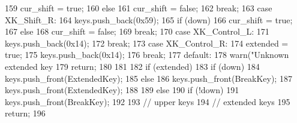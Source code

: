 \begin{DoxyCode}
{{{{159                     cur_shift = true;
160                 else
161                     cur_shift = false;
162                 break;
163              case XK_Shift_R:
164                 keys.push_back(0x59);
165                 if (down)
166                     cur_shift = true;
167                 else
168                     cur_shift = false;
169                 break;
170              case XK_Control_L:
171                 keys.push_back(0x14);
172                 break;
173              case XK_Control_R:
174                 extended = true;
175                 keys.push_back(0x14);
176                 break;
177              default:
178                warn("Unknown extended key %
179                return;
180             }
181 
182             if (extended) {
183                 if (down) {
184                     keys.push_front(ExtendedKey);
185                 } else {
186                     keys.push_front(BreakKey);
187                     keys.push_front(ExtendedKey);
188                 }
189             } else {
190                 if (!down)
191                     keys.push_front(BreakKey);
192             }
193         } // upper keys
194     } // extended keys
195     return;
196 }
\end{DoxyCode}


